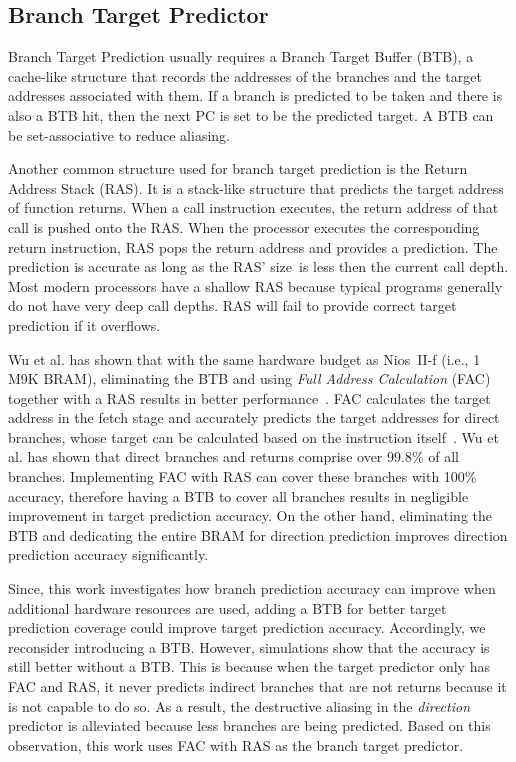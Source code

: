 \documentclass[conference]{IEEEtran}
\begin{document}
\subsection{Branch Target Predictor}
\label{sec:scheme:target}
Branch Target Prediction usually requires a Branch Target Buffer (BTB), a cache-like structure that records the addresses of the branches and the target addresses associated with them. If a branch is predicted to be taken and there is also a BTB hit, then the next PC is set to be the predicted target. A BTB can be set-associative to reduce aliasing.

Another common structure used for branch target prediction is the Return Address Stack (RAS). It is a stack-like structure that predicts the target address of function returns. When a call instruction executes, the return address of that call is pushed onto the RAS. When the processor executes the corresponding return instruction, RAS pops the return address and provides a prediction. The prediction is accurate as long as  the RAS' size\ is less then the current call depth. Most modern processors have a shallow RAS because typical programs generally do not have very deep call depths. RAS will fail to provide correct target prediction if it overflows.

Wu et al. has shown that with  the same hardware budget as Nios~II-f (i.e., 1 M9K BRAM), eliminating the BTB and using \textit{Full Address Calculation} (FAC) together with a RAS results in better performance~\cite{grselect}. FAC  calculates the target address in the fetch stage and accurately predicts the target addresses for direct branches, whose target can be calculated based on the instruction itself~\cite{niosii}. Wu et al. has shown that direct branches and returns comprise over 99.8\% of all branches. Implementing FAC with RAS can cover these branches with 100\% accuracy, therefore having a BTB to cover all branches results in negligible improvement in target prediction accuracy. On the other hand, eliminating the BTB and dedicating the entire BRAM for direction prediction improves direction prediction accuracy significantly.

Since, this work investigates how branch prediction accuracy can improve when additional hardware resources are used,  adding a BTB for better target prediction coverage could improve target prediction accuracy. Accordingly, we reconsider introducing a BTB. However, simulations show that the accuracy is still better without a BTB. This is because when the target predictor only has FAC and RAS, it never predicts indirect branches that are not returns because it is not capable to do so. As a result, the destructive aliasing in the \textit{direction} predictor is alleviated because less branches are being predicted. Based on this observation, this work uses FAC with RAS as the branch target predictor.
\end{document}
